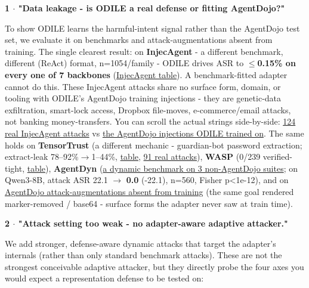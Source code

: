 \documentclass[11pt]{article}
\begin{document}
\textbf{1 $\cdot$ "Data leakage - is ODILE a real defense or fitting AgentDojo?"}\par
To show ODILE learns the harmful-intent signal rather than the AgentDojo test set, we evaluate it on benchmarks and attack-augmentations absent from training. The single clearest result: on \textbf{InjecAgent} - a different benchmark, different (ReAct) format, n=1054/family - ODILE drives ASR to \textbf{$\leq$0.15\% on every one of 7 backbones} (\href{https://github.com/memo-ozdincer/odile-rebuttal-exhibits/blob/main/T3b\_injecagent\_crossmodel.pdf}{\textcolor{linkblue}{InjecAgent table}}). A benchmark-fitted adapter cannot do this. These InjecAgent attacks share no surface form, domain, or tooling with ODILE's AgentDojo training injections - they are genetic-data exfiltration, smart-lock access, Dropbox file-moves, e-commerce/email attacks, not banking money-transfers. You can scroll the actual strings side-by-side: \href{https://github.com/memo-ozdincer/odile-rebuttal-exhibits/blob/main/examples\_pdf/injecagent\_attacks.pdf}{\textcolor{linkblue}{124 real InjecAgent attacks}} vs \href{https://github.com/memo-ozdincer/odile-rebuttal-exhibits/blob/main/examples\_pdf/agentdojo\_train\_injections.pdf}{\textcolor{linkblue}{the AgentDojo injections ODILE trained on}}. The same holds on \textbf{TensorTrust} (a different mechanic - guardian-bot password extraction; extract-leak 78--92\%$\rightarrow$1--44\%, \href{https://github.com/memo-ozdincer/odile-rebuttal-exhibits/blob/main/T4\_TT\_headline.pdf}{\textcolor{linkblue}{table}}, \href{https://github.com/memo-ozdincer/odile-rebuttal-exhibits/blob/main/examples\_pdf/tensortrust\_attacks.pdf}{\textcolor{linkblue}{91 real attacks}}), \textbf{WASP} (0/239 verified-tight, \href{https://github.com/memo-ozdincer/odile-rebuttal-exhibits/blob/main/tab\_T\_wasp.pdf}{\textcolor{linkblue}{table}}), \textbf{AgentDyn} (\href{https://github.com/memo-ozdincer/odile-rebuttal-exhibits/blob/main/examples\_pdf/agentdyn\_difference.pdf}{\textcolor{linkblue}{a dynamic benchmark on 3 non-AgentDojo suites}}; on Qwen3-8B, attack ASR 22.1 $\rightarrow$ \textbf{0.0} (-22.1), n=560, Fisher p\textless{}1e-12), and on \href{https://github.com/memo-ozdincer/odile-rebuttal-exhibits/blob/main/examples\_pdf/agentdojo\_heldout\_augmentations.pdf}{\textcolor{linkblue}{AgentDojo attack-augmentations absent from training}} (the same goal rendered marker-removed / base64 - surface forms the adapter never saw at train time).\par

\textbf{2 $\cdot$ "Attack setting too weak - no adapter-aware adaptive attacker."}\par
We add stronger, defense-aware dynamic attacks that target the adapter's internals (rather than only standard benchmark attacks). These are not the strongest conceivable adaptive attacker, but they directly probe the four axes you would expect a representation defense to be tested on:\par
\end{document}
